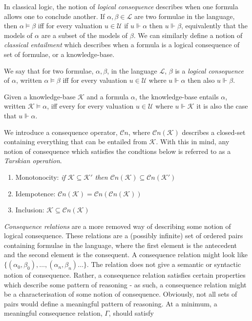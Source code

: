 In classical logic, the notion of \emph{logical consequence} describes when one formula allows one to conclude another. If $\alpha, \beta \in \mathcal{L}$ are two formulae in the language, then $\alpha \vDash \beta$ iff for every valuation $u \in \mathcal{U}$ if $u \Vdash \alpha$ then $u \Vdash \beta$, equivalently that the models of $\alpha$ are a subset of the models of $\beta$. We can similarly define a notion of \emph{classical entailment} which describes when a formula is a logical consequence of set of formulae, or a knowledge-base.
%
\begin{definition}
    \label{definition: logical consequence}
    We say that for two formulae, $\alpha, \beta$, in the language $\mathcal{L}$, $\beta$ is a \emph{logical consequence} of $\alpha$, written $\alpha \vDash \beta$ iff for every valuation $u \in \mathcal{U}$ where $u \Vdash \alpha$ then also $u \Vdash \beta$.
\end{definition}
%
\begin{definition}
    \label{defintion: classical entailment}
    Given a knowledge-base $\mathcal{K}$ and a formula $\alpha$, the knowledge-base entails $\alpha$, written $\mathcal{K} \models \alpha$, iff every for every valuation $u \in \mathcal{U}$ where $u \Vdash \mathcal{K}$ it is also the case that $u \Vdash \alpha$.
\end{definition}
%
We introduce a consequence operator, $\mathcal{C}n$, where $\mathcal{C}n(\mathcal{K})$ describes a closed-set containing everything that can be entailed from $\mathcal{K}$. With this in mind, any notion of consequence which satisfies the condtions below is referred to as a \emph{Tarskian operation}.
\begin{enumerate}
    \item Monotonocity: \textit{if $\mathcal{K} \subseteq \mathcal{K'}$ then $\mathcal{C}n(\mathcal{K}) \subseteq \mathcal{C}n(\mathcal{K'})$}
    \item Idempotence: $\mathcal{C}n(\mathcal{K}) = \mathcal{C}n(\mathcal{C}n(\mathcal{K}))$
    \item Inclusion: $\mathcal{K} \subseteq \mathcal{C}n(\mathcal{K})$
\end{enumerate}
%
\emph{Consequence relations} are a more removed way of describing some notion of logical consequence. These relations are a (possibly infinite) set of ordered pairs containing formulae in the language, where the first element is the antecedent and the second element is the consequent. A consequence relation might look like $\{(\alpha_0, \beta_0), \ldots, (\alpha_n, \beta_n)\ldots\}$. The relation does not give a semantic or syntactic notion of consequence. Rather, a consequence relation satisfies certain properties which describe some pattern of reasoning - as such, a consequence relation might be a characterisation of some notion of consequence. Obviously, not all sets of pairs would define a meaningful pattern of reasoning. At a minimum, a meaningful consequence relation, $\Gamma$, should satisfy
